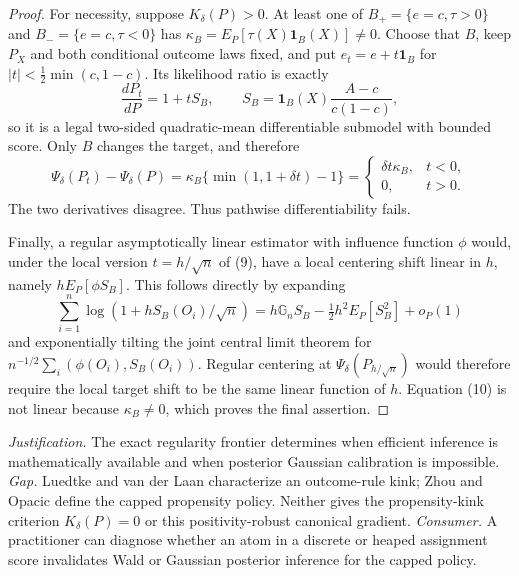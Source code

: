 \documentclass{article}
\begin{document}
\begin{proof}
For necessity, suppose \(K_\delta(P)>0\).  At least one of
\(B_+=\{e=c,\tau>0\}\) and \(B_-=\{e=c,\tau<0\}\) has
\(\kappa_B=E_P[\tau(X)\mathbf1_B(X)]\ne0\).  Choose that \(B\), keep \(P_X\) and both conditional outcome laws fixed, and put \(e_t=e+t\mathbf1_B\) for
\(|t|<\frac12\min(c,1-c)\).  Its likelihood ratio is exactly
\begin{equation}
 \frac{dP_t}{dP}=1+tS_B,\qquad
 S_B=\mathbf1_B(X)\frac{A-c}{c(1-c)},                                                     \tag{9}
\end{equation}
so it is a legal two-sided quadratic-mean differentiable submodel with bounded score.  Only \(B\) changes the target, and therefore
\begin{equation}
 \Psi_\delta(P_t)-\Psi_\delta(P)
 =\kappa_B\{\min(1,1+\delta t)-1\}
 =\begin{cases}\delta t\kappa_B,&t<0,\\0,&t>0.\end{cases}                              \tag{10}
\end{equation}
The two derivatives disagree.  Thus pathwise differentiability fails.

Finally, a regular asymptotically linear estimator with influence function \(\phi\) would, under the local version \(t=h/\sqrt n\) of (9), have a local centering shift linear in \(h\), namely \(hE_P[\phi S_B]\).  This follows directly by expanding
\begin{equation}
 \sum_{i=1}^n\log(1+hS_B(O_i)/\sqrt n)
 =h\mathbb G_nS_B-\tfrac12h^2E_P[S_B^2]+o_P(1)
\end{equation}
and exponentially tilting the joint central limit theorem for
\(n^{-1/2}\sum_i(\phi(O_i),S_B(O_i))\).  Regular centering at
\(\Psi_\delta(P_{h/\sqrt n})\) would therefore require the local target shift to be the same linear function of \(h\).  Equation (10) is not linear because \(\kappa_B\ne0\), which proves the final assertion.
\end{proof}
\par\smallskip\noindent \textit{Justification.} The exact regularity frontier determines when efficient inference is mathematically available and when posterior Gaussian calibration is impossible. \textit{Gap.} Luedtke and van der Laan characterize an outcome-rule kink; Zhou and Opacic define the capped propensity policy. Neither gives the propensity-kink criterion \(K_\delta(P)=0\) or this positivity-robust canonical gradient. \textit{Consumer.} A practitioner can diagnose whether an atom in a discrete or heaped assignment score invalidates Wald or Gaussian posterior inference for the capped policy.
\end{document}
